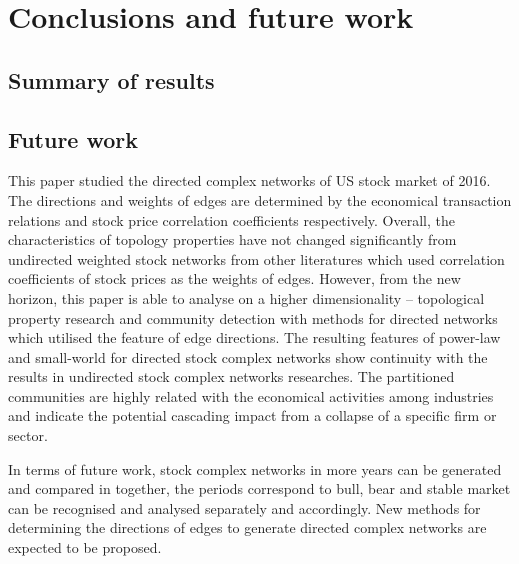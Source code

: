 \chapter[Conclusions]{Conclusions and future work}
\label{cpt:conclude}

\section{Summary of results}
\section{Future work}

This paper studied the directed complex networks of US stock market of 2016. The directions and weights of edges are determined by the economical transaction relations and stock price correlation coefficients respectively. Overall, the characteristics of topology properties have not changed significantly from undirected weighted stock networks from other literatures which used correlation coefficients of stock prices as the weights of edges. However, from the new horizon, this paper is able to analyse on a higher dimensionality -- topological property research and community detection with methods for directed networks which utilised the feature of edge directions. The resulting features of power-law and small-world for directed stock complex networks show continuity with the results in undirected stock complex networks researches. The partitioned communities are highly related with the economical activities among industries and indicate the potential cascading impact from a collapse of a specific firm or sector.

In terms of future work, stock complex networks in more years can be generated and compared in together, the periods correspond to bull, bear and stable market can be recognised and analysed separately and accordingly. New methods for determining the directions of edges to generate directed complex networks are expected to be proposed.
